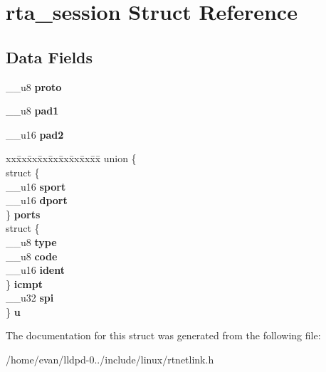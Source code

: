 \section{rta\-\_\-session \-Struct \-Reference}
\label{structrta__session}
\subsection*{\-Data \-Fields}
\begin{DoxyCompactItemize}
\item 
\-\_\-\-\_\-u8 {\bfseries proto}\label{structrta__session_aa10718770c4b82fd3f5876fa0fc03695}

\item 
\-\_\-\-\_\-u8 {\bfseries pad1}\label{structrta__session_a19c8df3232dae98313fbddfaaa9b0881}

\item 
\-\_\-\-\_\-u16 {\bfseries pad2}\label{structrta__session_a0fde79048f42d4d54137aa2ca7b8720f}

\item 
\begin{tabbing}
xx\=xx\=xx\=xx\=xx\=xx\=xx\=xx\=xx\=\kill
union \{\\
\>struct \{\\
\>\>\_\_u16 {\bfseries sport}\\
\>\>\_\_u16 {\bfseries dport}\\
\>\} {\bfseries ports}\\
\>struct \{\\
\>\>\_\_u8 {\bfseries type}\\
\>\>\_\_u8 {\bfseries code}\\
\>\>\_\_u16 {\bfseries ident}\\
\>\} {\bfseries icmpt}\\
\>\_\_u32 {\bfseries spi}\\
\} {\bfseries u}\label{structrta__session_a17c804871c3fc5e8ed0d34bf81624053}
\\

\end{tabbing}\end{DoxyCompactItemize}


\-The documentation for this struct was generated from the following file\-:\begin{DoxyCompactItemize}
\item 
/home/evan/lldpd-\/0../include/linux/rtnetlink.\-h\end{DoxyCompactItemize}
